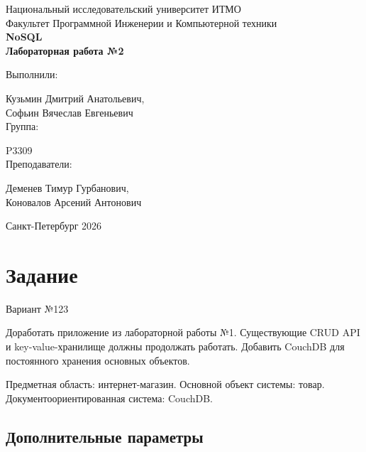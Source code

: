 \documentclass[12pt,a4paper]{article}
\begin{document}
\begin{titlepage}

\begin{center}
    \LARGE Национальный исследовательский университет ИТМО\\[8mm]

    Факультет Программной Инженерии и Компьютерной техники\\[37mm]

    \huge \textbf{NoSQL}\\[2mm]
    \textbf{Лабораторная работа №2} \\[2mm]
\end{center}

\vfill

\begin{flushright}
    \large Выполнили:

    Кузьмин Дмитрий Анатольевич, \\
    Софьин Вячеслав Евгеньевич \\[3mm]
    Группа:

    P3309\\[3mm]

    Преподаватели:

    Деменев Тимур Гурбанович,\\
    Коновалов Арсений Антонович
\end{flushright}

\vfill

\begin{center}
    Санкт-Петербург 2026
\end{center}

\end{titlepage}

\section*{Задание}

Вариант №123

Доработать приложение из лабораторной работы №1. Существующие CRUD API и key-value-хранилище должны продолжать работать. Добавить CouchDB для постоянного хранения основных объектов.

Предметная область: интернет-магазин.
Основной объект системы: товар.
Документоориентированная система: CouchDB.

\subsection*{Дополнительные параметры}
\end{document}
